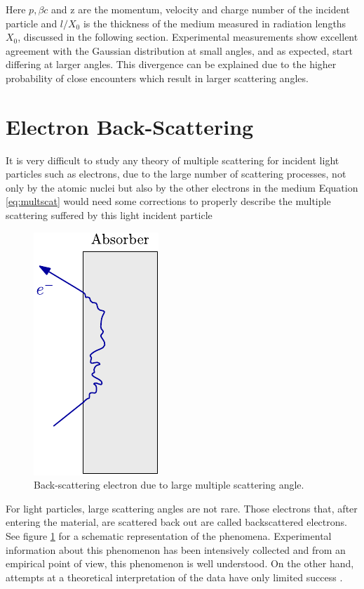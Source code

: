 Here $p,\beta c $ and z are the momentum, velocity and charge number of the incident particle and $l/X_0$ is the thickness of the medium measured in radiation lengths $X_0$, discussed in the following section. Experimental measurements show excellent agreement with the Gaussian distribution at small angles, and as expected, start differing at larger angles. This divergence can be explained due to the higher probability of close encounters which result in larger scattering angles. 

\section{Electron Back-Scattering}
\label{sec:BS}
It is very difficult to study any theory of multiple scattering for incident light particles such as electrons, due to the large number of scattering processes, not only by the atomic nuclei but also by the other electrons in the medium \parencite*[][]{ref:MultipleElec1} Equation \ref{eq:multscat} would need some corrections to properly describe the multiple scattering suffered by this light incident particle \parencite*[][]{ref:MultipleElec2}

\begin{figure}[h]
    \centering
    \includegraphics[width=0.25\columnwidth]{ElectronBS/ElectronBS.pdf}
    \caption{Back-scattering electron due to large multiple scattering angle.}
    \label{fig:backscatt}
\end{figure}

For light particles, large scattering angles are not rare. Those electrons that, after entering the material, are scattered back out are called backscattered electrons. See figure \ref{fig:backscatt} for a schematic representation of the phenomena.  Experimental information about this phenomenon has been intensively collected and from an empirical point of view, this phenomenon is well understood. On the other hand, attempts at a theoretical interpretation of the data have only limited success \parencite[][]{ref:BackScatTheo}.


